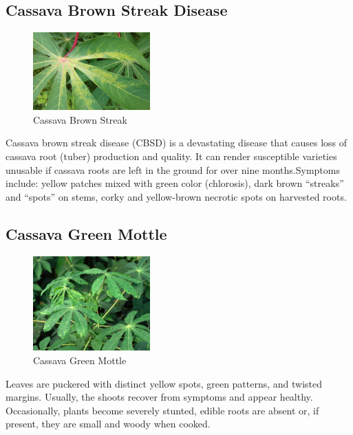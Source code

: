 \documentclass{article}
\begin{document}
\subsection{Cassava Brown Streak Disease}

\begin{figure}[!htb]
    \centering
    \includegraphics[width=0.4\textwidth]{cassava-brown-streak-disease-manioc-1.jpg}
    \caption{Cassava Brown Streak}
    \label{CBB}
\end{figure}
Cassava brown streak disease (CBSD) is
a devastating disease that causes loss of
cassava root (tuber) production and quality.
It can render susceptible varieties unusable
if cassava roots are left in the ground for
over nine months.Symptoms include: yellow patches mixed with green color (chlorosis), dark brown “streaks” and “spots” on stems, corky and yellow-brown necrotic spots on harvested roots.
\cite{fundament}



\subsection{Cassava Green Mottle}

\begin{figure}[!htb]
    \centering
    \includegraphics[width=0.4\textwidth]{cgmv.jpg}
    \caption{Cassava Green Mottle}
    \label{CBB}
\end{figure}

Leaves are puckered with distinct yellow spots, green patterns, and twisted margins. Usually, the shoots recover from symptoms and appear healthy. Occasionally, plants become severely stunted, edible roots are absent or, if present, they are small and woody when cooked.
\cite{fundament1}
\end{document}
